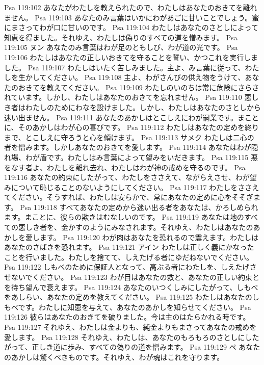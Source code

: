 Psa 119:102  あなたがわたしを教えられたので、わたしはあなたのおきてを離れません。
Psa 119:103  あなたのみ言葉はいかにわがあごに甘いことでしょう。蜜にまさってわが口に甘いのです。
Psa 119:104  わたしはあなたのさとしによって知恵を得ました。それゆえ、わたしは偽りのすべての道を憎みます。
Psa 119:105  ヌン あなたのみ言葉はわが足のともしび、わが道の光です。
Psa 119:106  わたしはあなたの正しいおきてを守ることを誓い、かつこれを実行しました。
Psa 119:107  わたしはいたく苦しみました。主よ、み言葉に従って、わたしを生かしてください。
Psa 119:108  主よ、わがさんびの供え物をうけて、あなたのおきてを教えてください。
Psa 119:109  わたしのいのちは常に危険にさらされています。しかし、わたしはあなたのおきてを忘れません。
Psa 119:110  悪しき者はわたしのためにわなを設けました。しかし、わたしはあなたのさとしから迷い出ません。
Psa 119:111  あなたのあかしはとこしえにわが嗣業です。まことに、そのあかしはわが心の喜びです。
Psa 119:112  わたしはあなたの定めを終りまで、とこしえに守ろうと心を傾けます。
Psa 119:113  サメク わたしは二心の者を憎みます。しかしあなたのおきてを愛します。
Psa 119:114  あなたはわが隠れ場、わが盾です。わたしはみ言葉によって望みをいだきます。
Psa 119:115  悪をなす者よ、わたしを離れ去れ、わたしはわが神の戒めを守るのです。
Psa 119:116  あなたの約束にしたがって、わたしをささえて、ながらえさせ、わが望みについて恥じることのないようにしてください。
Psa 119:117  わたしをささえてください。そうすれば、わたしは安らかで、常にあなたの定めに心をそそぎます。
Psa 119:118  すべてあなたの定めから迷い出る者をあなたは、かろしめられます。まことに、彼らの欺きはむなしいのです。
Psa 119:119  あなたは地のすべての悪しき者を、金かすのようにみなされます。それゆえ、わたしはあなたのあかしを愛します。
Psa 119:120  わが肉はあなたを恐れるので震えます。わたしはあなたのさばきを恐れます。
Psa 119:121  アイン わたしは正しく義にかなったことを行いました。わたしを捨てて、しえたげる者にゆだねないでください。
Psa 119:122  しもべのために保証人となって、高ぶる者にわたしを、しえたげさせないでください。
Psa 119:123  わが目はあなたの救と、あなたの正しい約束とを待ち望んで衰えます。
Psa 119:124  あなたのいつくしみにしたがって、しもべをあしらい、あなたの定めを教えてください。
Psa 119:125  わたしはあなたのしもべです。わたしに知恵を与えて、あなたのあかしを知らせてください。
Psa 119:126  彼らはあなたのおきてを破りました。今は主のはたらかれる時です。
Psa 119:127  それゆえ、わたしは金よりも、純金よりもまさってあなたの戒めを愛します。
Psa 119:128  それゆえ、わたしは、あなたのもろもろのさとしにしたがって、正しき道に歩み、すべての偽りの道を憎みます。
Psa 119:129  ペ あなたのあかしは驚くべきものです。それゆえ、わが魂はこれを守ります。
